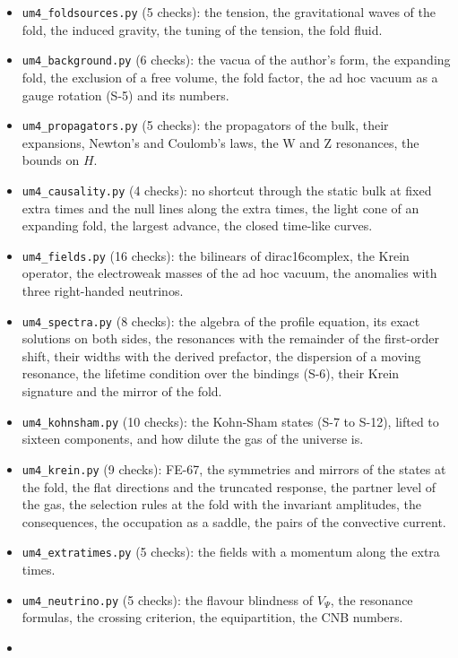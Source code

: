 \documentclass[
  10pt,
]{article}
\begin{document}
\begin{itemize}
  times, the size of the corrections, the Weyl term that dust requires.
\item
  \texttt{um4\_foldsources.py} (5 checks): the tension, the
  gravitational waves of the fold, the induced gravity, the tuning of
  the tension, the fold fluid.
\item
  \texttt{um4\_background.py} (6 checks): the vacua of the author's
  form, the expanding fold, the exclusion of a free volume, the fold
  factor, the ad hoc vacuum as a gauge rotation (S-5) and its numbers.
\item
  \texttt{um4\_propagators.py} (5 checks): the propagators of the bulk,
  their expansions, Newton's and Coulomb's laws, the W and Z resonances,
  the bounds on \(H\).
\item
  \texttt{um4\_causality.py} (4 checks): no shortcut through the static
  bulk at fixed extra times and the null lines along the extra times,
  the light cone of an expanding fold, the largest advance, the closed
  time-like curves.
\item
  \texttt{um4\_fields.py} (16 checks): the bilinears of dirac16complex,
  the Krein operator, the electroweak masses of the ad hoc vacuum, the
  anomalies with three right-handed neutrinos.
\item
  \texttt{um4\_spectra.py} (8 checks): the algebra of the profile
  equation, its exact solutions on both sides, the resonances with the
  remainder of the first-order shift, their widths with the derived
  prefactor, the dispersion of a moving resonance, the lifetime
  condition over the bindings (S-6), their Krein signature and the
  mirror of the fold.
\item
  \texttt{um4\_kohnsham.py} (10 checks): the Kohn-Sham states (S-7 to
  S-12), lifted to sixteen components, and how dilute the gas of the
  universe is.
\item
  \texttt{um4\_krein.py} (9 checks): FE-67, the symmetries and mirrors
  of the states at the fold, the flat directions and the truncated
  response, the partner level of the gas, the selection rules at the
  fold with the invariant amplitudes, the consequences, the occupation
  as a saddle, the pairs of the convective current.
\item
  \texttt{um4\_extratimes.py} (5 checks): the fields with a momentum
  along the extra times.
\item
  \texttt{um4\_neutrino.py} (5 checks): the flavour blindness of
  \(V_\Psi\), the resonance formulas, the crossing criterion, the
  equipartition, the CNB numbers.
\item

\end{itemize}
\end{document}
